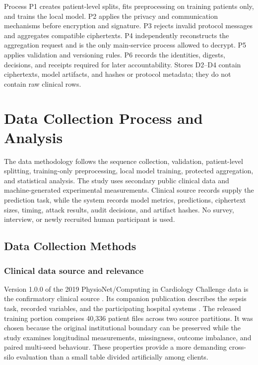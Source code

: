 Process P1 creates patient-level splits, fits preprocessing on training patients only, and trains the local model. P2 applies the privacy and communication mechanisms before encryption and signature. P3 rejects invalid protocol messages and aggregates compatible ciphertexts. P4 independently reconstructs the aggregation request and is the only main-service process allowed to decrypt. P5 applies validation and versioning rules. P6 records the identities, digests, decisions, and receipts required for later accountability. Stores D2--D4 contain ciphertexts, model artifacts, and hashes or protocol metadata; they do not contain raw clinical rows.

\section{Data Collection Process and Analysis}
\label{sec:data-methods}

The data methodology follows the sequence collection, validation, patient-level splitting, training-only preprocessing, local model training, protected aggregation, and statistical analysis. The study uses secondary public clinical data and machine-generated experimental measurements. Clinical source records supply the prediction task, while the system records model metrics, predictions, ciphertext sizes, timing, attack results, audit decisions, and artifact hashes. No survey, interview, or newly recruited human participant is used.

\subsection{Data Collection Methods}
\label{subsec:data-collection}

\subsubsection{Clinical data source and relevance}

Version 1.0.0 of the 2019 PhysioNet/Computing in Cardiology Challenge data is the confirmatory clinical source \cite{physionet2019sepsis}. Its companion publication describes the sepsis task, recorded variables, and the participating hospital systems \cite{reyna2020early}. The released training portion comprises 40,336 patient files across two source partitions. It was chosen because the original institutional boundary can be preserved while the study examines longitudinal measurements, missingness, outcome imbalance, and paired multi-seed behaviour. These properties provide a more demanding cross-silo evaluation than a small table divided artificially among clients.

